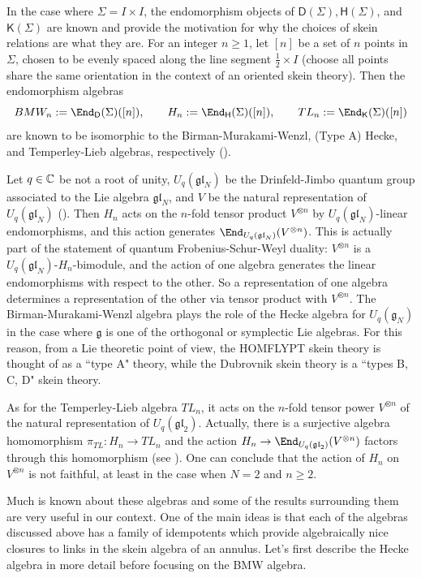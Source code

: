 In the case where $\Sigma = I \times I$, the endomorphism objects of $\mathsf{D}(\Sigma), \mathsf{H}(\Sigma)$, and $\mathsf{K}(\Sigma)$ are known and provide the motivation for why the choices of skein relations are what they are. For an integer $n \geq 1$, let $[n]$ be a set of $n$ points in $\Sigma$, chosen to be evenly spaced along the line segment $\frac{1}{2} \times I$ (choose all points share the same orientation in the context of an oriented skein theory). Then the endomorphism algebras 
\[
BMW_n := \End_\mathsf{D}(\Sigma)([n]), \qquad H_n := \End_\mathsf{H}(\Sigma)([n]), \qquad TL_n := \End_\mathsf{K}(\Sigma)([n])
\]
are known to be isomorphic to the Birman-Murakami-Wenzl, (Type A) Hecke, and Temperley-Lieb algebras, respectively (). 

Let $q \in \mathbb{C}$ be not a root of unity, $U_q(\mathfrak{gl}_N)$ be the Drinfeld-Jimbo quantum group associated to the Lie algebra $\mathfrak{gl}_N$, and $V$ be the natural representation of $U_q(\mathfrak{gl}_N)$ (). Then $H_n$ acts on the $n$-fold tensor product $V^{\otimes n}$ by $U_q(\mathfrak{gl}_N)$-linear endomorphisms, and this action generates $\End_{U_q(\mathfrak{gl}_N)}(V^{\otimes n})$. This is actually part of the statement of quantum Frobenius-Schur-Weyl duality: $V^{\otimes n}$ is a $U_q(\mathfrak{gl}_N)$-$H_n$-bimodule, and the action of one algebra generates the linear endomorphisms with respect to the other. So a representation of one algebra determines a representation of the other via tensor product with $V^{\otimes n}$. The Birman-Murakami-Wenzl algebra plays the role of the Hecke algebra for $U_q(\mathfrak{g}_N)$ in the case where $\mathfrak{g}$ is one of the orthogonal or symplectic Lie algebras. For this reason, from a Lie theoretic point of view, the HOMFLYPT skein theory is thought of as a ``type A" theory, while the Dubrovnik skein theory is a ``types B, C, D" skein theory.

As for the Temperley-Lieb algebra $TL_n$, it acts on the $n$-fold tensor power $V^{\otimes n}$ of the natural representation of $U_q(\mathfrak{gl}_2)$. Actually, there is a surjective algebra homomorphism $\pi_{TL}: H_n \to TL_n$ and the action $H_n \to \End_{U_q(\mathfrak{gl}_2)}(V^{\otimes n})$ factors through this homomorphism (see ). One can conclude that the action of $H_n$ on $V^{\otimes n}$ is not faithful, at least in the case when $N=2$ and $n \geq 2$. 

Much is known about these algebras and some of the results surrounding them are very useful in our context. One of the main ideas is that each of the algebras discussed above has a family of idempotents which provide algebraically nice closures to links in the skein algebra of an annulus. Let's first describe the Hecke algebra in more detail before focusing on the BMW algebra. 

